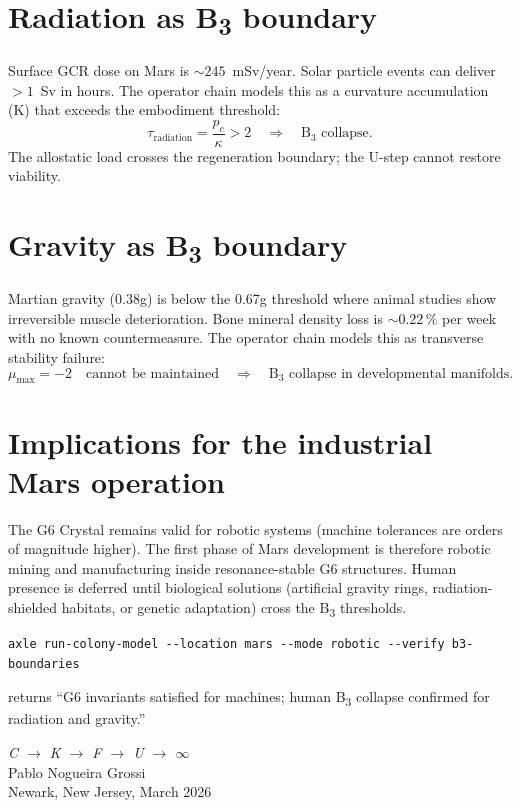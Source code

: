 \section{Radiation as B\textsubscript{3} boundary}

Surface GCR dose on Mars is $\sim 245$~mSv/year. Solar particle events can deliver $>1$~Sv in hours. The operator chain models this as a curvature accumulation (K) that exceeds the embodiment threshold:
\[
\tau_{\text{radiation}} = \frac{p_c}{\kappa} > 2 \quad \Rightarrow \quad \text{B}_3 \text{ collapse}.
\]
The allostatic load crosses the regeneration boundary; the U-step cannot restore viability.

\section{Gravity as B\textsubscript{3} boundary}

Martian gravity (0.38g) is below the 0.67g threshold where animal studies show irreversible muscle deterioration. Bone mineral density loss is $\sim 0.22\,\%$ per week with no known countermeasure. The operator chain models this as transverse stability failure:
\[
\mu_{\max} = -2 \quad \text{cannot be maintained} \quad \Rightarrow \quad \text{B}_3 \text{ collapse in developmental manifolds}.
\]

\section{Implications for the industrial Mars operation}

The G6 Crystal remains valid for robotic systems (machine tolerances are orders of magnitude higher). The first phase of Mars development is therefore robotic mining and manufacturing inside resonance-stable G6 structures. Human presence is deferred until biological solutions (artificial gravity rings, radiation-shielded habitats, or genetic adaptation) cross the B\textsubscript{3} thresholds.

\begin{verbatim}
axle run-colony-model --location mars --mode robotic --verify b3-boundaries
\end{verbatim}
returns ``G6 invariants satisfied for machines; human B\textsubscript{3} collapse confirmed for radiation and gravity.''

\bigskip
\begin{flushright}
\textit{C \;$\to$\; K \;$\to$\; F \;$\to$\; U \;$\to$\; $\infty$}\\[0.3em]
Pablo Nogueira Grossi\\
Newark, New Jersey, March 2026
\end{flushright}

